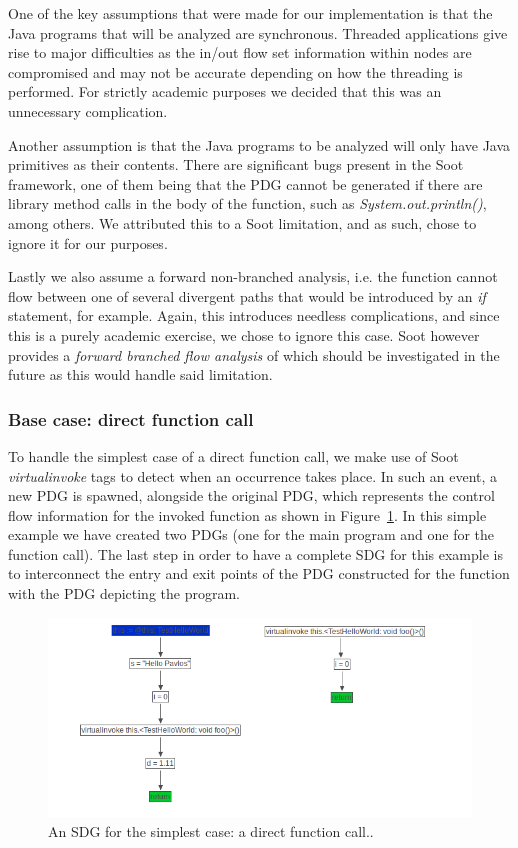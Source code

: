 \documentclass[authoryear,preprint]{sigplanconf}
\begin{document}
One of the key assumptions that were made for our implementation is that the Java programs that will be analyzed are synchronous. Threaded applications give rise to major difficulties as the in/out flow set information within nodes are compromised and may not be accurate depending on how the threading is performed. For strictly academic purposes we decided that this was an unnecessary complication.

Another assumption is that the Java programs to be analyzed will only have Java primitives as their contents. There are significant bugs present in the Soot framework, one of them being that the PDG cannot be generated if there are library method calls in the body of the function, such as \textit{System.out.println()}, among others. We attributed this to a Soot limitation, and as such, chose to ignore it for our purposes.

Lastly we also assume a forward non-branched analysis, i.e. the function cannot flow between one of several divergent paths that would be introduced by an \textit{if} statement, for example. Again, this introduces needless complications, and since this is a purely academic exercise, we chose to ignore this case. Soot however provides a \textit{forward branched flow analysis} of which should be investigated in the future as this would handle said limitation.

\subsubsection{Base case: direct function call}

To handle the simplest case of a direct function call, we make use of Soot \textit{virtualinvoke} tags to detect when an occurrence takes place. In such an event, a new PDG is spawned, alongside the original PDG, which represents the control flow information for the invoked function as shown in Figure~\ref{f:firstImpl}. In this simple example we have created two PDGs (one for the main program and one for the function call). The last step in order to have a complete SDG for this example is to interconnect the entry and exit points of the PDG constructed for the function with the PDG depicting the program.

\begin{figure}[ht]
	\centering
	\includegraphics[width=.8\linewidth]{figures/Selection_083}
	\caption[An SDG for the simplest case: a direct function call.]{\label{f:firstImpl}An SDG for the simplest case: a direct function call..}
\end{figure}
\end{document}
